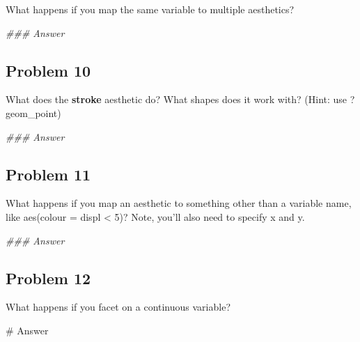 \documentclass[
  letterpaper,
  DIV=11,
  numbers=noendperiod]{scrreprt}
\newenvironment{Shaded}{\begin{snugshade}}{\end{snugshade}}
\newcommand{\CommentTok}[1]{\textcolor[rgb]{0.37,0.37,0.37}{#1}}
\newcommand{\DocumentationTok}[1]{\textcolor[rgb]{0.37,0.37,0.37}{\textit{#1}}}
\begin{document}
What happens if you map the same variable to multiple aesthetics?

\begin{Shaded}
\begin{Highlighting}[]
\DocumentationTok{\#\#\# Answer}
\end{Highlighting}
\end{Shaded}

\subsection*{Problem 10}\label{problem-10-1}

What does the \textbf{stroke} aesthetic do? What shapes does it work
with? (Hint: use ?geom\_point)

\begin{Shaded}
\begin{Highlighting}[]
\DocumentationTok{\#\#\# Answer}
\end{Highlighting}
\end{Shaded}

\subsection*{Problem 11}\label{problem-11-1}

What happens if you map an aesthetic to something other than a variable
name, like aes(colour = displ \textless{} 5)? Note, you'll also need to
specify x and y.

\begin{Shaded}
\begin{Highlighting}[]
\DocumentationTok{\#\#\# Answer}
\end{Highlighting}
\end{Shaded}

\subsection*{Problem 12}\label{problem-12-1}

What happens if you facet on a continuous variable?

\begin{Shaded}
\begin{Highlighting}[]
\CommentTok{\# Answer}
\end{Highlighting}
\end{Shaded}
\end{document}
